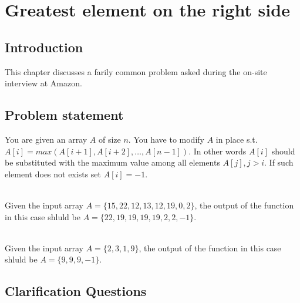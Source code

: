 %


\chapter{Greatest element on the right side}
\label{ch:greatest_right}
\section*{Introduction}
This chapter discusses a farily common problem asked during the on-site interview at Amazon.

\section{Problem statement}
\begin{exercise}
You are given an array $A$ of size $n$. You have to modify $A$ in place s.t. $A[i] = max(A[i+1], A[i+2],\ldots, A[n-1])$. In other words $A[i]$ should be substituted with  the maximum value among all elements $A[j], j > i$. If such element does not exists set $A[i] = -1$.

	\begin{example}
		\hfill \\
		Given the input array $A = \{15, 22, 12, 13, 12, 19, 0, 2\}$, the output of the function in this case shluld be  $A = \{22, 19, 19, 19, 19, 2, 2, -1\}$.
	\end{example}

	\begin{example}
		\hfill \\
		Given the input array $A = \{2, 3, 1, 9\}$, the output of the function in this case shluld be  $A = \{9, 9, 9, -1\}$.
	\end{example}

\end{exercise}


\section{Clarification Questions}

